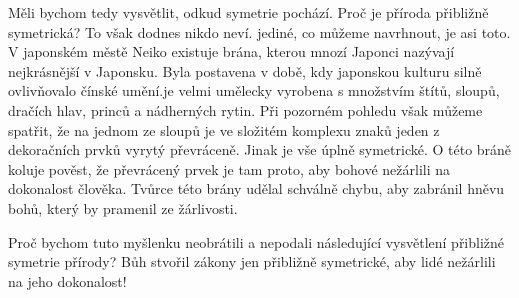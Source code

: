     Měli bychom tedy vysvětlit, odkud symetrie pochází. Proč je příroda přibližně symetrická? To
    však dodnes nikdo neví. jediné, co můžeme navrhnout, je asi toto. V japonském městě Neiko
    existuje brána, kterou mnozí Japonci nazývají nejkrásnější v Japonsku. Byla postavena v době,
    kdy japonskou kulturu silně ovlivňovalo čínské umění.je velmi umělecky vyrobena s množstvím
    štítů, sloupů, dračích hlav, princů a nádherných rytin. Při pozorném pohledu však můžeme
    spatřit, že na jednom ze sloupů je ve složitém komplexu znaků jeden z dekoračních prvků vyrytý
    převráceně. Jinak je vše úplně symetrické. O této bráně koluje pověst, že převrácený prvek je
    tam proto, aby bohové nežárlili na dokonalost člověka. Tvůrce této brány udělal schválně chybu,
    aby zabránil hněvu bohů, který by pramenil ze žárlivosti.
    
    Proč bychom tuto myšlenku neobrátili a nepodali následující vysvětlení přibližné symetrie
    přírody? Bůh stvořil zákony jen přibližně symetrické, aby lidé nežárlili na jeho dokonalost!

